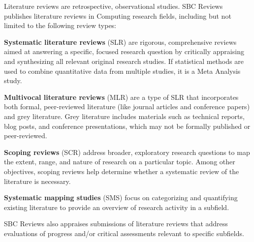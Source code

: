\documentclass[english]{sbcreviews-2025}%
\begin{document}
Literature reviews are retrospective, observational studies. 
SBC Reviews publishes literature reviews in Computing research fields, including but not limited to the following review types:

\textbf{Systematic literature reviews} (SLR) are rigorous, comprehensive reviews aimed at answering a specific, focused research question by critically appraising and synthesizing all relevant original research studies. If statistical methods are used to combine quantitative data from  multiple studies, it is a Meta Analysis study.

\textbf{Multivocal literature reviews} (MLR) are a type of SLR that incorporates both formal, peer-reviewed literature (like journal articles and conference papers) and grey literature. Grey literature includes materials such as technical reports, blog posts, and conference presentations, which may not be formally published or peer-reviewed. 

\textbf{Scoping reviews} (SCR) address broader, exploratory research questions to map the extent, range, and nature of research on a particular topic. Among other objectives, scoping reviews help determine whether a systematic review of the literature is necessary.

\textbf{Systematic mapping studies} (SMS) focus on categorizing and quantifying existing literature to provide an overview of research activity in a subfield.

SBC Reviews also appraises submissions of literature reviews that address evaluations of progress and/or critical assessments relevant to specific subfields.



 
\end{document}
